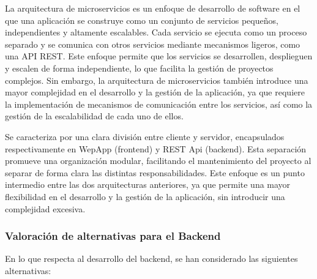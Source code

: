 La arquitectura de microservicios es un enfoque de desarrollo de software en el que una aplicación se construye como un conjunto de servicios pequeños, independientes y altamente escalables. Cada servicio se ejecuta como un proceso separado y se comunica con otros servicios mediante mecanismos ligeros, como una API REST.
Este enfoque permite que los servicios se desarrollen, desplieguen y escalen de forma independiente, lo que facilita la gestión de proyectos complejos. Sin embargo, la arquitectura de microservicios también introduce una mayor complejidad en el desarrollo y la gestión de la aplicación, ya que requiere la implementación de mecanismos de comunicación entre los servicios, así como la gestión de la escalabilidad de cada uno de ellos.

Se caracteriza por una clara división entre cliente y servidor, encapsulados respectivamente en WepApp (frontend) y REST Api (backend). Esta separación promueve una organización modular, facilitando el mantenimiento del proyecto al separar de forma clara las distintas responsabilidades. 
Este enfoque es un punto intermedio entre las dos arquitecturas anteriores, ya que permite una mayor flexibilidad en el desarrollo y la gestión de la aplicación, sin introducir una complejidad excesiva. 

\subsubsection{Valoración de alternativas para el Backend}
En lo que respecta al desarrollo del backend, se han considerado las siguientes alternativas:


